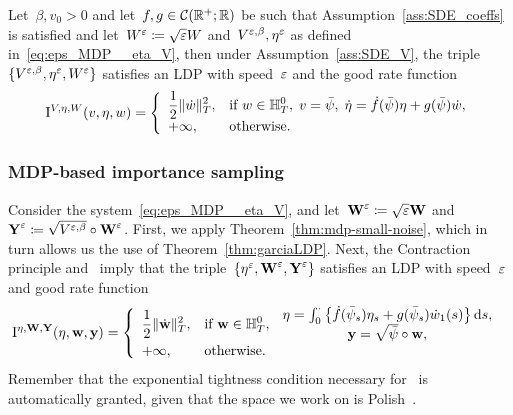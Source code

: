 \begin{theorem}\label{thm:mdp-small-noise}
Let~$\beta, v_0>0$ and let~$f, g \in \mathcal{C}(\mathbb{R}^+;  \mathbb{R})$ be such that Assumption~\ref{ass:SDE_coeffs} is satisfied and let~$W^{\varepsilon} \coloneqq \sqrt{\varepsilon}W$ and~$V^{\varepsilon,\beta}, \eta^{\varepsilon}$ as defined in~\eqref{eq:eps_MDP__eta_V}, then under Assumption~\ref{ass:SDE_V}, the triple
$\{V^{\varepsilon,\beta}, \eta^\varepsilon,W^\varepsilon\}$ satisfies an LDP with speed~$\varepsilon$ and the good rate function
\begin{equation*}
\mathrm{I}^{V,\eta,W}(v,\eta,w) = 
\left\{
\begin{array}{ll}
\displaystyle \frac{1}{2}\|\dot{w}\|_{T}^2, & \text{if }
\displaystyle 
w \in \mathbb{H}_T^0,\;
v = \bar\psi,\;
\dot{\eta} = \dot{f}(\bar\psi)\eta + g(\bar\psi)\dot{w},\\
+\infty, & \text{otherwise}.
\end{array}
\right.
\end{equation*}
\end{theorem}


\subsubsection{MDP-based importance sampling}
Consider the system~\eqref{eq:eps_MDP__eta_V}, 
and let~$\boldsymbol{\mathrm{W}}^\varepsilon \coloneqq \sqrt{\varepsilon}\boldsymbol{\mathrm{W}}$ and~$\boldsymbol{\mathrm{Y}}^\varepsilon \coloneqq \sqrt{V^{\varepsilon,\beta}}\circ \boldsymbol{\mathrm{W}}^\varepsilon$. 
First, we apply Theorem~\ref{thm:mdp-small-noise}, which in turn allows us the use of Theorem~\ref{thm:garciaLDP}. Next, the Contraction principle and~\cite[Exercise 4.2.7]{Dembo2010LargeApplications} imply that the triple~$\{\eta^\varepsilon,\boldsymbol{\mathrm{W}}^\varepsilon, \boldsymbol{\mathrm{Y}}^\varepsilon\}$ satisfies an LDP with speed~$\varepsilon$ and good rate function
\begin{equation*}
\mathrm{I}^{\eta,\boldsymbol{\mathrm{W}},\boldsymbol{\mathrm{Y}}}(\eta,\boldsymbol{\mathrm{w}}, \boldsymbol{\mathrm{y}}) =
\left\{
\begin{array}{ll}
\displaystyle 
\frac{1}{2}\|\dot{\boldsymbol{\mathrm{w}}}\|_{T}^2, & \text{if }
\displaystyle 
\boldsymbol{\mathrm{w}} \in \mathbb{H}_T^0,\; \begin{array}{cc}
    \eta = \int_0^\cdot\left\{\dot{f}(\bar\psi_s)\eta_s + g(\bar\psi_s)\dot{w}_1(s)\right\}\mathrm{d} s, \\
     \boldsymbol{\mathrm{y}} = \sqrt{\bar\psi}\circ \boldsymbol{\mathrm{w}},
\end{array}
\\
+\infty, & \text{otherwise}.
\end{array}
\right.
\end{equation*}
Remember that the exponential tightness condition necessary for~\cite[Exercise 4.2.7]{Dembo2010LargeApplications} is automatically granted, given that the space we work on is Polish~\cite[Lemma~2.6]{Lynch1987LargeIncrements}.

